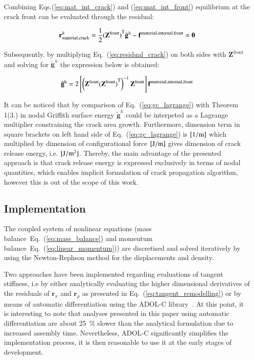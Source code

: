 \documentclass[11pt]{acmeArticle}
\numberwithin{equation}{section}
\begin{document}
Combining Eqs.(\ref{eq:mat_int_crack}) and (\ref{eq:mat_int_front}) equilibrium at the crack front can be evaluated through the residual:

\begin{equation}
\mathbf{r}^h_{\textrm{material,crack}} = \dfrac{1}{2} {(\mathbf{Z}^\textrm{front})}^{\rm{T}} {\tilde{\mathbf{g}}}^h - \mathbf{f}^\textrm{material,internal,front} = \mathbf{0}
	\label{eq:residual_crack}
\end{equation}

Subsequently. by multiplying Eq.~(\ref{eq:residual_crack}) on both sides with $\mathbf{Z}^\textrm{front}$ and solving for ${\tilde{\mathbf{g}}}^h$ the expression below is obtained:


\begin{equation}
	{\tilde{\mathbf{g}}}^\textrm{h}
	= 2
	\left[
	\left(\mathbf{Z}^{\rm{front}}{(\mathbf{Z}^{\rm{front}})}^\textrm{T}\right)^{-1}
	\mathbf{Z}^{\rm{front}}
	\right]
	\mathbf{f}^\textrm{material,internal,front}	
\label{eq:gc_lagrange}
\end{equation}

It can be noticed that by comparison of Eq.~({\ref{eq:gc_lagrange}}) with Theorem 1(3.) in \citep{AinsworthEssential} 
nodal Griffith surface energy ${\tilde{\mathbf{g}}}^h$ could be interpeted as a Lagrange multiplier constraining the crack area growth.
Furthermore, dimension term in square brackets on left hand side of Eq.~(\ref{eq:gc_lagrange}) is $[\rm{1/m}]$ which multiplied by dimension
of configurational force $[\rm{J/m}]$ gives dimension of crack release energy, i.e.
$[{\rm{J/m^2}}]$. Thereby, the main advantage of the presented approach is that crack release 
energy is expressed exclusively in terms of nodal quantities, which enables
implicit formulation of crack propagation algorithm, however this is 
out of the scope of this work.

\subsection{Implementation}

The coupled system of nonlinear equations (mass
balance~Eq.~(\ref{eq:mass_balance}) and momentum
balance~Eq.~(\ref{eq:linear_momentum})) are discretised and solved iteratively by
using the Newton-Rephson method for the displacements and density.

Two approaches have been implemented regarding evaluations of tangent stiffness,
i.e by either analytically evaluating the higher dimensional derivatives of the residuals of $\mathbf{r}_{x}$ and $\mathbf{r}_{\rho}$ as 
presented in Eq.~(\ref{eq:tangent_remodelling}) or by means of automatic differentiation using the ADOL-C 
library~\citep{Walther2009}. At this point, it is interesting to note that analyses presented in this paper using automatic 
differentiation are about 25~$\%$ slower than the analytical formulation due to increased assembly time.
Nevertheless, ADOL-C significantly simplifies the implementation process, it is then reasonable to use it at the early stages of development.
\end{document}
